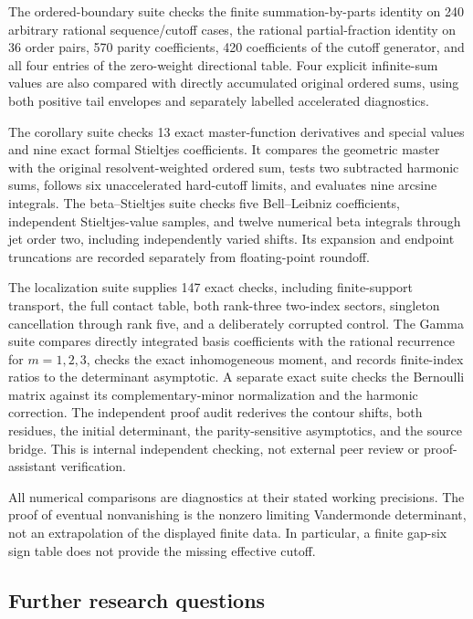 \documentclass[11pt,a4paper]{article}
\numberwithin{equation}{section}
\theoremstyle{definition}
\theoremstyle{remark}
\begin{document}
The ordered-boundary suite checks the finite summation-by-parts
identity on 240 arbitrary rational sequence/cutoff cases, the rational
partial-fraction identity on 36 order pairs, 570 parity coefficients,
420 coefficients of the cutoff generator, and all four entries of
the zero-weight directional table. Four explicit infinite-sum values
are also compared with directly accumulated original ordered sums,
using both positive tail envelopes and separately labelled accelerated
diagnostics.

The corollary suite checks 13 exact master-function derivatives and
special values and nine exact formal Stieltjes coefficients. It
compares the geometric master with the original resolvent-weighted
ordered sum, tests two subtracted harmonic sums, follows six
unaccelerated hard-cutoff limits, and evaluates nine arcsine integrals.
The beta--Stieltjes suite checks five Bell--Leibniz coefficients,
independent Stieltjes-value samples, and twelve numerical beta
integrals through jet order two, including independently varied
shifts. Its expansion and endpoint truncations are recorded
separately from floating-point roundoff.

The localization suite supplies 147 exact checks, including
finite-support transport, the full contact table, both rank-three
two-index sectors, singleton cancellation through rank five, and a
deliberately corrupted control. The Gamma suite compares directly
integrated basis coefficients with the rational recurrence for
$m=1,2,3$, checks the exact inhomogeneous moment, and records
finite-index ratios to the determinant asymptotic. A separate exact
suite checks the Bernoulli matrix against its complementary-minor
normalization and the harmonic correction. The independent proof
audit rederives the contour shifts, both residues, the initial
determinant, the parity-sensitive asymptotics, and the source bridge.
This is internal independent checking, not external peer review or
proof-assistant verification.

All numerical comparisons are diagnostics at their stated working
precisions. The proof of eventual nonvanishing is the nonzero
limiting Vandermonde determinant, not an extrapolation of the
displayed finite data. In particular, a finite gap-six sign table
does not provide the missing effective cutoff.

\subsection{Further research questions}
\end{document}
